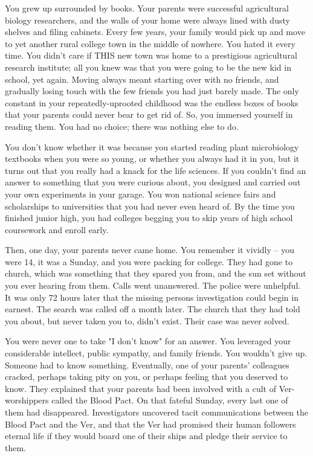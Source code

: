\documentclass[char]{guildcamp4}
\begin{document}
\name{\cSpite{}}

You grew up surrounded by books. Your parents were successful agricultural biology researchers, and the walls of your home were always lined with dusty shelves and filing cabinets. Every few years, your family would pick up and move to yet another rural college town in the middle of nowhere. You hated it every time. You didn't care if THIS new town was home to a prestigious agricultural research institute; all you knew was that you were going to be the new kid in school, yet again. Moving always meant starting over with no friends, and gradually losing touch with the few friends you had just barely made. The only constant in your repeatedly-uprooted childhood was the endless boxes of books that your parents could never bear to get rid of. So, you immersed yourself in reading them. You had no choice; there was nothing else to do.

You don't know whether it was because you started reading plant microbiology textbooks when you were so young, or whether you always had it in you, but it turns out that you really had a knack for the life sciences. If you couldn't find an answer to something that you were curious about, you designed and carried out your own experiments in your garage. You won national science fairs and scholarships to universities that you had never even heard of. By the time you finished junior high, you had colleges begging you to skip years of high school coursework and enroll early. 

Then, one day, your parents never came home. You remember it vividly -- you were 14, it was a Sunday, and you were packing for college. They had gone to church, which was something that they spared you from, and the sun set without you ever hearing from them. Calls went unanswered. The police were unhelpful. It was only 72 hours later that the missing persons investigation could begin in earnest. The search was called off a month later. The church that they had told you about, but never taken you to, didn't exist. Their case was never solved.

You were never one to take "I don't know" for an answer. You leveraged your considerable intellect, public sympathy, and family friends. You wouldn't give up. Someone had to know something. Eventually, one of your parents' colleagues cracked, perhaps taking pity on you, or perhaps feeling that you deserved to know. They explained that your parents had been involved with a cult of Ver-worshippers called the Blood Pact. On that fateful Sunday, every last one of them had disappeared. Investigators uncovered tacit communications between the Blood Pact and the Ver, and that the Ver had promised their human followers eternal life if they would board one of their ships and pledge their service to them. 
\end{document}
